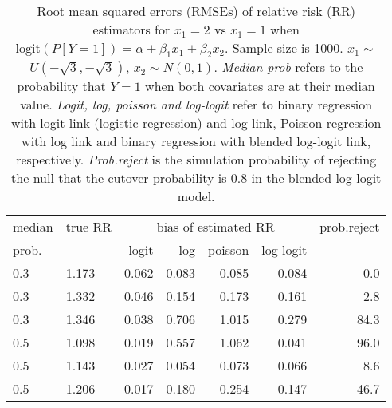 \documentclass[12pt,a4paper]{article}
\begin{document}
\begin{table}[H] 
\small\sf\centering 
\caption{Root mean squared errors (RMSEs) of relative risk (RR) estimators for $x_1=2$ vs $x_1=1$ when $\mbox{logit}(P[Y=1])=\alpha+\beta_1 x_1 + \beta_2 x_2$. Sample size is 1000. $x_1 \sim $$U(-\sqrt{3},-\sqrt{3})$, $x_2 \sim N(0,1)$. {\it Median prob} refers to the probability that $Y=1$ when both covariates are at their median value. {\it Logit, log, poisson and log-logit} refer to binary regression with logit link (logistic regression) and log link, Poisson regression with log link and binary regression with blended log-logit link, respectively. {\it Prob.reject} is the simulation probability of rejecting the null that the cutover probability is $0.8$ in the blended log-logit model.} 
\begin{tabular}{llrrrrr} 
\toprule 
median & true RR & \multicolumn{4}{c}{bias of estimated RR} & prob.reject \\ 
prob. & & logit & log & poisson & log-logit  & \\ \midrule 
0.3 & 1.173 & 0.062 & 0.083 & 0.085 & 0.084 &  0.0 \\  
0.3 & 1.332 & 0.046 & 0.154 & 0.173 & 0.161 &  2.8 \\  
0.3 & 1.346 & 0.038 & 0.706 & 1.015 & 0.279 & 84.3 \\  
0.5 & 1.098 & 0.019 & 0.557 & 1.062 & 0.041 & 96.0 \\  
0.5 & 1.143 & 0.027 & 0.054 & 0.073 & 0.066 &  8.6 \\  
0.5 & 1.206 & 0.017 & 0.180 & 0.254 & 0.147 & 46.7 \\  
\bottomrule 
\end{tabular} 
\end{table} 
\end{document}

